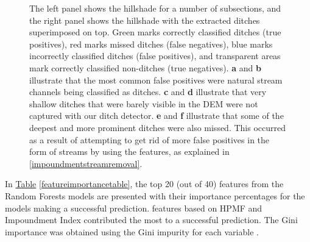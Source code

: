 \documentclass[11pt, review]{elsarticle} %
\begin{document}
\begin{figure} [!htb]
    \caption{The left panel shows the hillshade for a number of subsections, and the right panel shows the hillshade with the extracted ditches superimposed on top. Green marks correctly classified ditches (true positives), red marks missed ditches (false negatives), blue marks incorrectly classified ditches (false positives), and transparent areas mark correctly classified non-ditches (true negatives). \textbf{a} and \textbf{b} illustrate that the most common false positives were natural stream channels being classified as ditches. \textbf{c} and \textbf{d} illustrate that very shallow ditches that were barely visible in the DEM were not captured with our ditch detector. \textbf{e} and \textbf{f} illustrate that some of the deepest and more prominent ditches were also missed. This occurred as a result of attempting to get rid of more false positives in the form of streams by using the features, as explained in \ref{impoundmentstreamremoval}.}
    \label{fig:resultsillustrations}
\end{figure}

In \hyperref[featureimportancetable]{Table} \ref{featureimportancetable}, the top 20 (out of 40) features from the Random Forests models are presented with their importance percentages for the models making a successful prediction. features based on HPMF and Impoundment Index contributed the most to a successful prediction. The Gini importance was obtained using the Gini impurity for each variable \citep{gini}.
\end{document}
